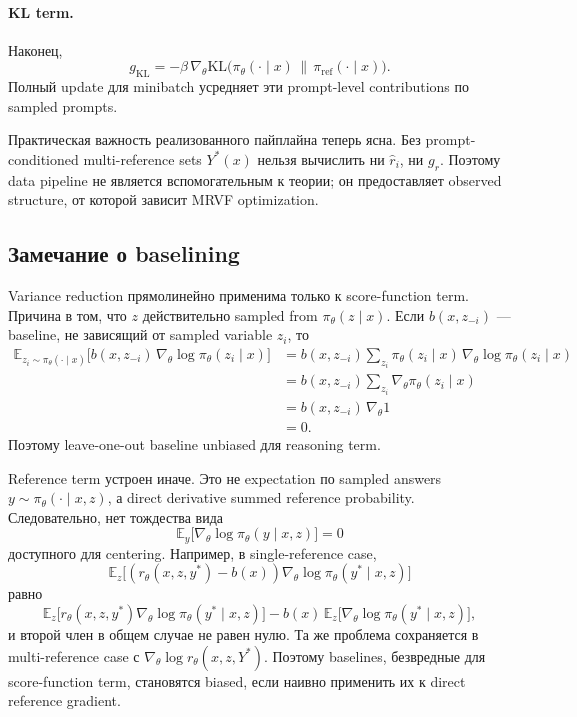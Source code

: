 \paragraph{KL term.}
Наконец,
\[
    g_{\mathrm{KL}}
    =
    -\beta\,
    \nabla_{\theta}
    \mathrm{KL}\big(
    \pi_{\theta}(\cdot\mid x)\,\|\,\pi_{\mathrm{ref}}(\cdot\mid x)
    \big).
\]
Полный update для minibatch усредняет эти prompt-level contributions по sampled prompts.

Практическая важность реализованного пайплайна теперь ясна. Без prompt-conditioned multi-reference sets \(Y^{*}(x)\) нельзя вычислить ни \(\hat r_i\), ни \(g_r\). Поэтому data pipeline не является вспомогательным к теории; он предоставляет observed structure, от которой зависит MRVF optimization.

\subsection{Замечание о baselining}

Variance reduction прямолинейно применима только к score-function term. Причина в том, что \(z\) действительно sampled from \(\pi_{\theta}(z\mid x)\). Если \(b(x,z_{-i})\) --- baseline, не зависящий от sampled variable \(z_i\), то
\begin{align*}
    \mathbb{E}_{z_i\sim\pi_{\theta}(\cdot\mid x)}
    \big[
        b(x,z_{-i})\,\nabla_{\theta}\log\pi_{\theta}(z_i\mid x)
        \big]
     & =
    b(x,z_{-i})
    \sum_{z_i}\pi_{\theta}(z_i\mid x)\,
    \nabla_{\theta}\log\pi_{\theta}(z_i\mid x)       \\
     & =
    b(x,z_{-i})
    \sum_{z_i}\nabla_{\theta}\pi_{\theta}(z_i\mid x) \\
     & =
    b(x,z_{-i})\,\nabla_{\theta}1                    \\
     & = 0.
\end{align*}
Поэтому leave-one-out baseline unbiased для reasoning term.

Reference term устроен иначе. Это не expectation по sampled answers \(y\sim\pi_{\theta}(\cdot\mid x,z)\), а direct derivative summed reference probability. Следовательно, нет тождества вида
\[
    \mathbb{E}_{y}\big[\nabla_{\theta}\log\pi_{\theta}(y\mid x,z)\big]=0
\]
доступного для centering. Например, в single-reference case,
\[
    \mathbb{E}_{z}
    \big[
        (r_{\theta}(x,z,y^{*})-b(x))
        \nabla_{\theta}\log\pi_{\theta}(y^{*}\mid x,z)
        \big]
\]
равно
\[
    \mathbb{E}_{z}
    \big[
        r_{\theta}(x,z,y^{*})
        \nabla_{\theta}\log\pi_{\theta}(y^{*}\mid x,z)
        \big]
    -
    b(x)\,
    \mathbb{E}_{z}
    \big[
        \nabla_{\theta}\log\pi_{\theta}(y^{*}\mid x,z)
        \big],
\]
и второй член в общем случае не равен нулю. Та же проблема сохраняется в multi-reference case с \(\nabla_{\theta}\log r_{\theta}(x,z,Y^{*})\). Поэтому baselines, безвредные для score-function term, становятся biased, если наивно применить их к direct reference gradient.

